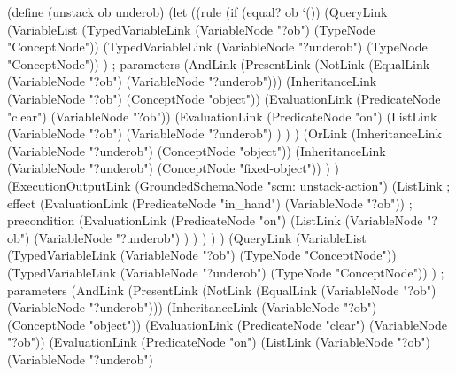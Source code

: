 \begin{python}
(define (unstack ob underob)
  (let
    ((rule
      (if (equal? ob `())
        (QueryLink
          (VariableList
            (TypedVariableLink 
              (VariableNode "?ob") 
              (TypeNode "ConceptNode"))
            (TypedVariableLink 
              (VariableNode "?underob") 
              (TypeNode "ConceptNode"))
          ) ; parameters
          (AndLink
            (PresentLink
              (NotLink
                (EqualLink 
                  (VariableNode "?ob") 
                  (VariableNode "?underob")))
              (InheritanceLink
                (VariableNode "?ob")
                (ConceptNode "object"))
              (EvaluationLink
                (PredicateNode "clear")
                (VariableNode "?ob"))
              (EvaluationLink
                (PredicateNode "on")
                (ListLink
                  (VariableNode "?ob")
                  (VariableNode "?underob")
                )
              )
            )
            (OrLink
              (InheritanceLink
                (VariableNode "?underob")
                (ConceptNode "object"))
              (InheritanceLink
                (VariableNode "?underob")
                (ConceptNode "fixed-object"))
            )
          )
          (ExecutionOutputLink
            (GroundedSchemaNode "scm: unstack-action")
            (ListLink
              ; effect
              (EvaluationLink
                (PredicateNode "in_hand")
                (VariableNode "?ob"))
              ; precondition
              (EvaluationLink
                (PredicateNode "on")
                (ListLink
                  (VariableNode "?ob")
                  (VariableNode "?underob")
                )
              )
            )
          )
        )
        (QueryLink
          (VariableList
            (TypedVariableLink 
              (VariableNode "?ob") 
              (TypeNode "ConceptNode"))
            (TypedVariableLink 
              (VariableNode "?underob") 
              (TypeNode "ConceptNode"))
          ) ; parameters
          (AndLink
            (PresentLink
              (NotLink
                (EqualLink 
                  (VariableNode "?ob") 
                  (VariableNode "?underob")))
              (InheritanceLink
                (VariableNode "?ob")
                (ConceptNode "object"))
              (EvaluationLink
                (PredicateNode "clear")
                (VariableNode "?ob"))
              (EvaluationLink
                (PredicateNode "on")
                (ListLink
                  (VariableNode "?ob")
                  (VariableNode "?underob")

\end{python}
